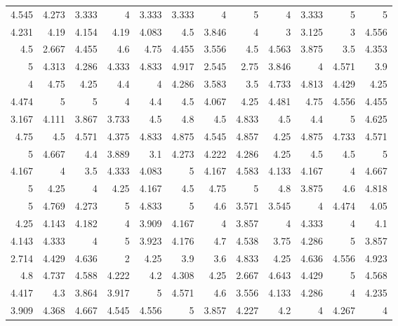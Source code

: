 \documentclass[10pt]{report}
\begin{document}
\begin{table}[!htpb]
    \centering

	\begin{tabular}{rrrrrrrrrrrr}
	\hline
	4.545 & 4.273 & 3.333 & 4     & 3.333 & 3.333 & 4     & 5     & 4     & 3.333 & 5     & 5     \\
	4.231 & 4.19  & 4.154 & 4.19  & 4.083 & 4.5   & 3.846 & 4     & 3     & 3.125 & 3     & 4.556 \\
	4.5   & 2.667 & 4.455 & 4.6   & 4.75  & 4.455 & 3.556 & 4.5   & 4.563 & 3.875 & 3.5   & 4.353 \\
	5     & 4.313 & 4.286 & 4.333 & 4.833 & 4.917 & 2.545 & 2.75  & 3.846 & 4     & 4.571 & 3.9   \\
	4     & 4.75  & 4.25  & 4.4   & 4     & 4.286 & 3.583 & 3.5   & 4.733 & 4.813 & 4.429 & 4.25  \\
	4.474 & 5     & 5     & 4     & 4.4   & 4.5   & 4.067 & 4.25  & 4.481 & 4.75  & 4.556 & 4.455 \\
	3.167 & 4.111 & 3.867 & 3.733 & 4.5   & 4.8   & 4.5   & 4.833 & 4.5   & 4.4   & 5     & 4.625 \\
	4.75  & 4.5   & 4.571 & 4.375 & 4.833 & 4.875 & 4.545 & 4.857 & 4.25  & 4.875 & 4.733 & 4.571 \\
	5     & 4.667 & 4.4   & 3.889 & 3.1   & 4.273 & 4.222 & 4.286 & 4.25  & 4.5   & 4.5   & 5     \\
	4.167 & 4     & 3.5   & 4.333 & 4.083 & 5     & 4.167 & 4.583 & 4.133 & 4.167 & 4     & 4.667 \\
	5     & 4.25  & 4     & 4.25  & 4.167 & 4.5   & 4.75  & 5     & 4.8   & 3.875 & 4.6   & 4.818 \\
	5     & 4.769 & 4.273 & 5     & 4.833 & 5     & 4.6   & 3.571 & 3.545 & 4     & 4.474 & 4.05  \\
	4.25  & 4.143 & 4.182 & 4     & 3.909 & 4.167 & 4     & 3.857 & 4     & 4.333 & 4     & 4.1   \\
	4.143 & 4.333 & 4     & 5     & 3.923 & 4.176 & 4.7   & 4.538 & 3.75  & 4.286 & 5     & 3.857 \\
	2.714 & 4.429 & 4.636 & 2     & 4.25  & 3.9   & 3.6   & 4.833 & 4.25  & 4.636 & 4.556 & 4.923 \\
	4.8   & 4.737 & 4.588 & 4.222 & 4.2   & 4.308 & 4.25  & 2.667 & 4.643 & 4.429 & 5     & 4.568 \\
	4.417 & 4.3   & 3.864 & 3.917 & 5     & 4.571 & 4.6   & 3.556 & 4.133 & 4.286 & 4     & 4.235 \\
	3.909 & 4.368 & 4.667 & 4.545 & 4.556 & 5     & 3.857 & 4.227 & 4.2   & 4     & 4.267 & 4     \\

\end{tabular}
\end{table}
\end{document}
